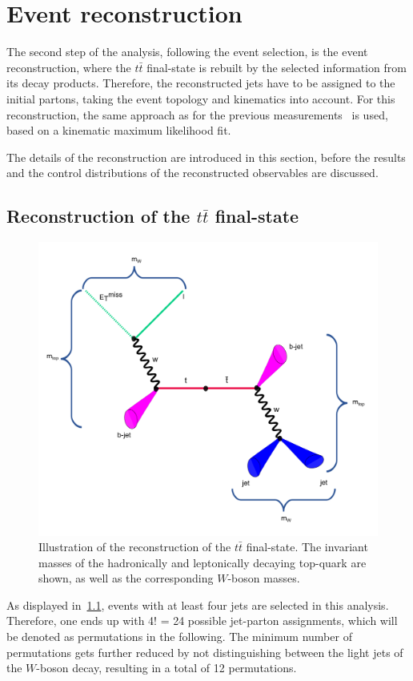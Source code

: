 \chapter{Event reconstruction}\label{ch5}
The second step of the analysis, following the event selection, is the event reconstruction, where the $t\bar{t}$ final-state is rebuilt by the selected information from its decay products. Therefore, the reconstructed jets have to be assigned to the initial partons, taking the event topology and kinematics into account. For this reconstruction, the same approach as for the previous measurements~\cite{Aad:2015nba, ATLAS-CONF-2017-071} is used, based on a kinematic maximum likelihood fit. 

The details of the reconstruction are introduced in this section, before the results and the control distributions of the reconstructed observables are discussed.  


\section{Reconstruction of the $t\bar{t}$ final-state}
\begin{figure}[h]
	\centering
	\includegraphics[width=0.65\linewidth]{Pics/cp5/51}
	\caption{ Illustration of the reconstruction of the $t\bar{t}$ final-state. The  invariant masses of the hadronically and leptonically decaying top-quark are shown, as well as the corresponding $W$-boson masses. } 
	\label{fig:51}
\end{figure}

As displayed in~\cref{fig:51}, events with at least four jets are selected in this analysis. Therefore, one ends up with 4! = 24 possible jet-parton assignments, which will be denoted as permutations in the following. The minimum number of permutations gets further reduced by not distinguishing between the light jets of the $W$-boson decay, resulting in a total of 12 permutations. 

